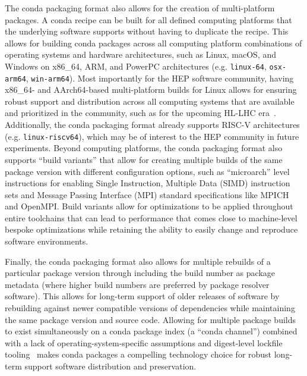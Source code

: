 The conda packaging format also allows for the creation of multi-platform packages.
A conda recipe can be built for all defined computing platforms that the underlying software supports without having to duplicate the recipe.
This allows for building conda packages across all computing platform combinations of operating systems and hardware architectures, such as Linux, macOS, and Windows on x86\_64, ARM, and PowerPC architectures (e.g. \texttt{linux-64}, \texttt{osx-arm64}, \texttt{win-arm64}).
Most importantly for the HEP software community, having x86\_64- and AArch64-based multi-platform builds for Linux allows for ensuring robust support and distribution across all computing systems that are available and prioritized in the community, such as for the upcoming HL-LHC era~\cite{CERN-LHCC-2022-005}.
Additionally, the conda packaging format already supports RISC-V architectures (e.g. \texttt{linux-riscv64}), which may be of interest to the HEP community in future experiments.
Beyond computing platforms, the conda packaging format also supports ``build variants'' that allow for creating multiple builds of the same package version with different configuration options, such as ``microarch'' level instructions for enabling Single Instruction, Multiple Data (SIMD) instruction sets and Message Passing Interface (MPI) standard specifications like MPICH and OpenMPI.
Build variants allow for optimizations to be applied throughout entire toolchains that can lead to performance that comes close to machine-level bespoke optimizations while retaining the ability to easily change and reproduce software environments.

Finally, the conda packaging format also allows for multiple rebuilds of a particular package version through including the build number as package metadata (where higher build numbers are preferred by package resolver software).
This allows for long-term support of older releases of software by rebuilding against newer compatible versions of dependencies while maintaining the same package version and source code.
Allowing for multiple package builds to exist simultaneously on a conda package index (a ``conda channel'') combined with a lack of operating-system-specific assumptions and digest-level lockfile tooling~\cite{Feickert:2025qru,fischer2025pixiunifiedsoftwaredevelopment} makes conda packages a compelling technology choice for robust long-term support software distribution and preservation.

